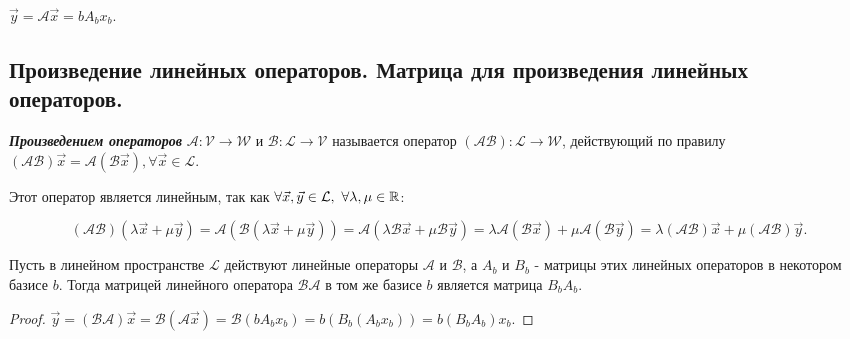 \begin{corollary}
    $\vec{y} = \mathscr{A}\vec{x} = bA_bx_b.$
\end{corollary}


\newpage


\subsection{
    Произведение линейных операторов. Матрица для произведения 
    линейных операторов.
}

\begin{definition}
    \textbf{\textit{Произведением операторов}} $\mathscr{A} \colon \mathcal{V} \to \mathcal{W}$ и $\mathscr{B} \colon \mathcal{L} \to \mathcal{V}$ называется оператор $(\mathscr{A}\mathscr{B}) \colon \mathcal{L} \to \mathcal{W}$, действующий по правилу $(\mathscr{A}\mathscr{B})\vec{x} = \mathscr{A}(\mathscr{B}\vec{x}), \forall \vec{x} \in \mathcal{L}$. 
    
    Этот оператор является линейным, так как $\forall \vec{x}, \vec{y} \in \mathcal{L},\thinspace \thinspace \forall \lambda, \mu \in \mathbb{R}$:

    $$(\mathscr{A}\mathscr{B})(\lambda\vec{x} + \mu\vec{y}) = \mathscr{A}(\mathscr{B}(\lambda\vec{x} + \mu\vec{y})) = \mathscr{A}(\lambda\mathscr{B}\vec{x} + \mu\mathscr{B}\vec{y}) = \lambda\mathscr{A}(\mathscr{B}\vec{x}) + \mu\mathscr{A}(\mathscr{B}\vec{y}) = \lambda(\mathscr{A}\mathscr{B})\vec{x} + \mu(\mathscr{A}\mathscr{B})\vec{y}.$$
\end{definition}

\begin{theorem}
    Пусть в линейном пространстве $\mathcal{L}$ действуют линейные операторы $\mathscr{A}$ и $\mathscr{B}$, а $A_b$ и $B_b$ - матрицы этих линейных операторов в некотором базисе $b$. Тогда матрицей линейного оператора $\mathscr{B}\mathscr{A}$ в том же базисе $b$ является матрица $B_bA_b$.
\end{theorem}

\begin{proof}
    $\vec{y} = (\mathscr{B}\mathscr{A})\vec{x} = \mathscr{B}(\mathscr{A}\vec{x}) = \mathscr{B}(bA_bx_b) = b(B_b(A_bx_b)) = b(B_bA_b)x_b.$
\end{proof}

